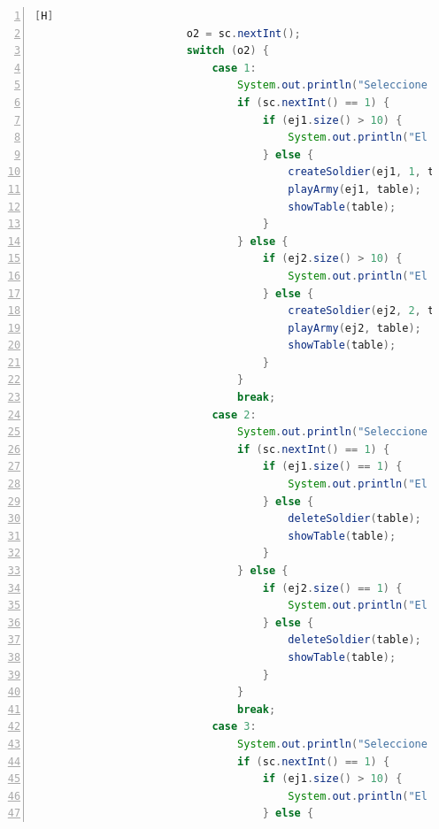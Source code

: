 \documentclass{article}
\begin{document}
\begin{lstlisting}[language=java,caption={Método main Final}, numbers=left][H]
                        o2 = sc.nextInt();
                        switch (o2) {
                            case 1:
                                System.out.println("Seleccione ejercito: ");
                                if (sc.nextInt() == 1) {
                                    if (ej1.size() > 10) {
                                        System.out.println("El ejercito no puede tener mas de 10 soldados");
                                    } else {
                                        createSoldier(ej1, 1, table);
                                        playArmy(ej1, table);
                                        showTable(table);
                                    }
                                } else {
                                    if (ej2.size() > 10) {
                                        System.out.println("El ejercito no puede tener mas de 10 soldados");
                                    } else {
                                        createSoldier(ej2, 2, table);
                                        playArmy(ej2, table);
                                        showTable(table);
                                    }
                                }
                                break;
                            case 2:
                                System.out.println("Seleccione ejercito: ");
                                if (sc.nextInt() == 1) {
                                    if (ej1.size() == 1) {
                                        System.out.println("El ejercito no puede estar vacio!");
                                    } else {
                                        deleteSoldier(table);
                                        showTable(table);
                                    }
                                } else {
                                    if (ej2.size() == 1) {
                                        System.out.println("El ejercito no puede estar vacio!");
                                    } else {
                                        deleteSoldier(table);
                                        showTable(table);
                                    }
                                }
                                break;
                            case 3:
                                System.out.println("Seleccione ejercito: ");
                                if (sc.nextInt() == 1) {
                                    if (ej1.size() > 10) {
                                        System.out.println("El ejercito no puede tener mas de 10 soldados");
                                    } else {

\end{lstlisting}
\end{document}
